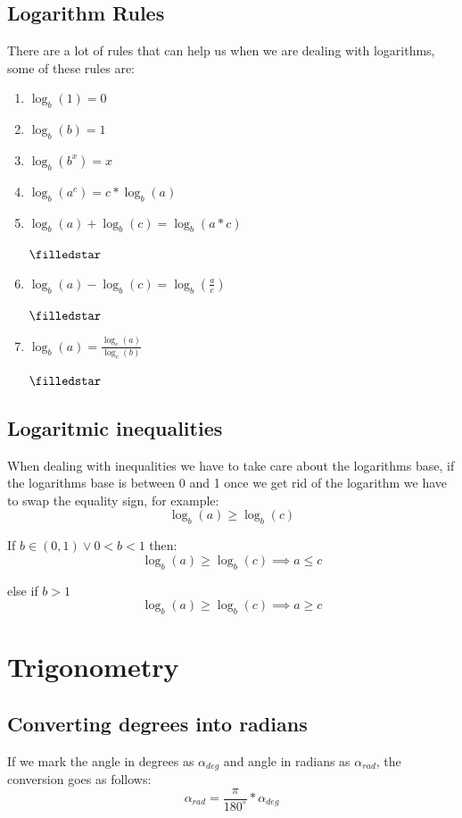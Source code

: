 \documentclass[a4paper, 15pt]{article}
\newcommand{\importantStar}{
	\begin{Large}
		\textcolor{red}{$\filledstar$}
	\end{Large}
}
\begin{document}
		\subsection{Logarithm Rules}
			\noindent There are a lot of rules that can help us when we are dealing with logarithms, some of these rules are:
			\begin{enumerate}
				\item $\log_{b}(1) = 0$
				\item $\log_{b}(b) = 1$
				\item $\log_{b}(b^x) = x$
				\item $\log_{b}(a^c) = c*\log_{b}(a)$
				\item $\log_{b}(a) + \log_{b}(c) = \log_{b}(a*c)$ \hspace{4mm} \importantStar
				\item $\log_{b}(a) - \log_{b}(c) = \log_{b}(\frac{a}{c})$ \hspace{4mm} \importantStar
				\item $\log_{b}(a) = \frac{\log_{c}(a)}{\log_{c}(b)}$ \hspace{4mm} \importantStar
			\end{enumerate}

		\subsection{Logaritmic inequalities}
			\noindent When dealing with inequalities we have to take care about the logarithms base, if the logarithms base is between 0 and 1 once we get rid of the logarithm we have to swap the equality sign, for example:
			\begin{equation*}
				\log_b(a) \geq \log_b(c)
			\end{equation*}

			\noindent If $b \in (0,1) \lor 0 < b < 1$ then:
			\begin{equation*}
				\log_b(a) \geq \log_b(c) \implies a \leq c
			\end{equation*}

			\noindent else if $b > 1$
			\begin{equation*}
				\log_b(a) \geq \log_b(c) \implies a \geq c
			\end{equation*}
			
	\section{Trigonometry}
		\subsection{Converting degrees into radians}
			\noindent If we mark the angle in degrees as \emph{$\alpha_{deg}$} and angle in radians as \emph{$\alpha_{rad}$}, the conversion goes as follows:
			\begin{equation*}
				\alpha_{rad} = \frac{\pi}{180^{\circ}} * \alpha_{deg}
			\end{equation*}
		
\end{document}

